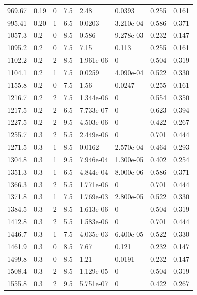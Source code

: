 \documentclass[preview]{standalone}
\begin{document}
{{{\begin{tabular}{L{1.2cm}C{1.2cm} C{0.3cm}C{0.5cm} C{1.4cm}C{1.4cm} C{1.4cm}C{1.4cm}}
  969.67  &  0.19  & 0     & 7.5 &  2.48  & 0.0393  & 0.255 &  0.161   \\ 
  995.41  &  0.20  & 1     & 6.5 &  0.0203  & 3.210e-04  & 0.586 &  0.371   \\ 
  1057.3  &   0.2  & 0     & 8.5 &  0.586  & 9.278e-03  & 0.232 &  0.147   \\ 
  1095.2  &   0.2  & 0     & 7.5 &  7.15  & 0.113  & 0.255 &  0.161   \\ 
  1102.2  &   0.2  & 2     & 8.5 &  1.961e-06  & 0  & 0.504 &  0.319   \\ 
  1104.1  &   0.2  & 1     & 7.5 &  0.0259  & 4.090e-04  & 0.522 &  0.330   \\ 
  1155.8  &   0.2  & 0     & 7.5 &  1.56  & 0.0247  & 0.255 &  0.161   \\ 
  1216.7  &   0.2  & 2     & 7.5 &  1.344e-06  & 0  & 0.554 &  0.350   \\ 
  1217.5  &   0.2  & 2     & 6.5 &  7.733e-07  & 0  & 0.623 &  0.394   \\ 
  1227.5  &   0.2  & 2     & 9.5 &  4.503e-06  & 0  & 0.422 &  0.267   \\ 
  1255.7  &   0.3  & 2     & 5.5 &  2.449e-06  & 0  & 0.701 &  0.444   \\ 
  1271.5  &   0.3  & 1     & 8.5 &  0.0162  & 2.570e-04  & 0.464 &  0.293   \\ 
  1304.8  &   0.3  & 1     & 9.5 &  7.946e-04  & 1.300e-05  & 0.402 &  0.254   \\ 
  1351.3  &   0.3  & 1     & 6.5 &  4.844e-04  & 8.000e-06  & 0.586 &  0.371   \\ 
  1366.3  &   0.3  & 2     & 5.5 &  1.771e-06  & 0  & 0.701 &  0.444   \\ 
  1371.8  &   0.3  & 1     & 7.5 &  1.769e-03  & 2.800e-05  & 0.522 &  0.330   \\ 
  1384.5  &   0.3  & 2     & 8.5 &  1.613e-06  & 0  & 0.504 &  0.319   \\ 
  1412.8  &   0.3  & 2     & 5.5 &  1.583e-06  & 0  & 0.701 &  0.444   \\ 
  1446.7  &   0.3  & 1     & 7.5 &  4.035e-03  & 6.400e-05  & 0.522 &  0.330   \\ 
  1461.9  &   0.3  & 0     & 8.5 &  7.67  & 0.121  & 0.232 &  0.147   \\ 
  1499.8  &   0.3  & 0     & 8.5 &  1.21  & 0.0191  & 0.232 &  0.147   \\ 
  1508.4  &   0.3  & 2     & 8.5 &  1.129e-05  & 0  & 0.504 &  0.319   \\ 
  1555.8  &   0.3  & 2     & 9.5 &  5.751e-07  & 0  & 0.422 &  0.267   \\ 

\end{tabular}}}}
\end{document}
